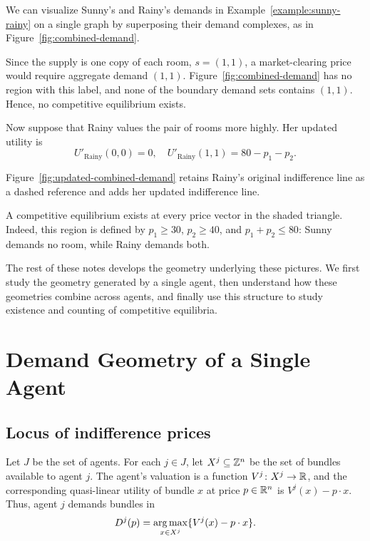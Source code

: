 \documentclass[../../main.tex]{subfiles}
\begin{document}
\begin{example}
    We can visualize Sunny's and Rainy's demands in
    Example~\ref{example:sunny-rainy} on a single graph by superposing their demand
    complexes, as in Figure~\ref{fig:combined-demand}.

    \CombinedDemandFigure
    
    Since the supply is one copy of each room, $s=(1,1)$, a market-clearing
    price would require aggregate demand $(1,1)$. Figure~\ref{fig:combined-demand}
    has no region with this label, and none of the boundary demand sets
    contains $(1,1)$. Hence, no competitive equilibrium exists.

    Now suppose that Rainy values the pair of rooms more highly. Her updated
    utility is
    \[
        U'_{\text{Rainy}}(0,0)=0,\quad
        U'_{\text{Rainy}}(1,1)=80-p_1-p_2.
    \]

    Figure~\ref{fig:updated-combined-demand} retains Rainy's original
    indifference line as a dashed reference and adds her updated indifference
    line.

    \UpdatedCombinedDemandFigure

    A competitive equilibrium exists at every price vector in the shaded
    triangle. Indeed, this region is defined by
    $p_1\ge 30$, $p_2\ge 40$, and $p_1+p_2\le 80$: Sunny demands no room,
    while Rainy demands both.
\end{example}

The rest of these notes develops the geometry underlying these pictures.
We first study the geometry generated by a single agent, then understand
how these geometries combine across agents, and finally use this structure
to study existence and counting of competitive equilibria.

\section{Demand Geometry of a Single Agent}

\subsection{Locus of indifference prices}

Let $J$ be the set of agents. For each $j \in J$, let
$X^j \subseteq \mathbb{Z}^n$ be the set of bundles available to agent $j$. 
The agent's valuation is a function $V^j\colon X^j \to \mathbb{R}$, 
and the corresponding quasi-linear utility of bundle $x$ 
at price $p\in\mathbb{R}^n$ is $V^j(x)-p\cdot x$. 
Thus, agent $j$ demands bundles in
\[
    D^j(p)=\operatorname*{arg\,max}_{x \in X^j}\{V^j(x)-p\cdot x\}.
\]
\end{document}
